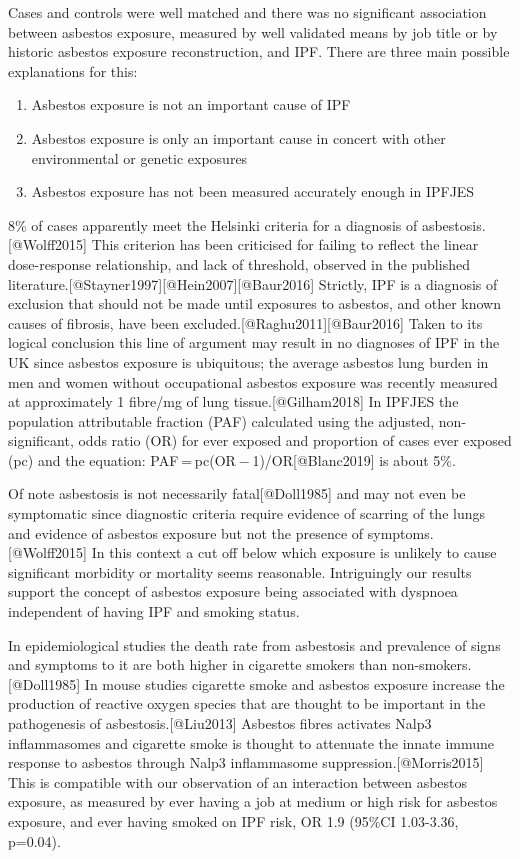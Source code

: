 \documentclass[
]{article}
\providecommand{\tightlist}{%
  \setlength{\itemsep}{0pt}\setlength{\parskip}{0pt}}
\begin{document}
Cases and controls were well matched and there was no significant
association between asbestos exposure, measured by well validated means
by job title or by historic asbestos exposure reconstruction, and IPF.
There are three main possible explanations for this:

\begin{enumerate}
\def\labelenumi{\arabic{enumi}.}
\tightlist
\item
  Asbestos exposure is not an important cause of IPF
\item
  Asbestos exposure is only an important cause in concert with other
  environmental or genetic exposures
\item
  Asbestos exposure has not been measured accurately enough in IPFJES
\end{enumerate}

8\% of cases apparently meet the Helsinki criteria for a diagnosis of
asbestosis.{[}@Wolff2015{]} This criterion has been criticised for
failing to reflect the linear dose-response relationship, and lack of
threshold, observed in the published
literature.{[}@Stayner1997{]}{[}@Hein2007{]}{[}@Baur2016{]} Strictly,
IPF is a diagnosis of exclusion that should not be made until exposures
to asbestos, and other known causes of fibrosis, have been
excluded.{[}@Raghu2011{]}{[}@Baur2016{]} Taken to its logical conclusion
this line of argument may result in no diagnoses of IPF in the UK since
asbestos exposure is ubiquitous; the average asbestos lung burden in men
and women without occupational asbestos exposure was recently measured
at approximately 1 fibre/mg of lung tissue.{[}@Gilham2018{]} In IPFJES
the population attributable fraction (PAF) calculated using the
adjusted, non-significant, odds ratio (OR) for ever exposed and
proportion of cases ever exposed (pc) and the equation:
PAF = pc(OR − 1)/OR{[}@Blanc2019{]} is about 5\%.

Of note asbestosis is not necessarily fatal{[}@Doll1985{]} and may not
even be symptomatic since diagnostic criteria require evidence of
scarring of the lungs and evidence of asbestos exposure but not the
presence of symptoms.{[}@Wolff2015{]} In this context a cut off below
which exposure is unlikely to cause significant morbidity or mortality
seems reasonable. Intriguingly our results support the concept of
asbestos exposure being associated with dyspnoea independent of having
IPF and smoking status.

In epidemiological studies the death rate from asbestosis and prevalence
of signs and symptoms to it are both higher in cigarette smokers than
non-smokers.{[}@Doll1985{]} In mouse studies cigarette smoke and
asbestos exposure increase the production of reactive oxygen species
that are thought to be important in the pathogenesis of
asbestosis.{[}@Liu2013{]} Asbestos fibres activates Nalp3 inflammasomes
and cigarette smoke is thought to attenuate the innate immune response
to asbestos through Nalp3 inflammasome suppression.{[}@Morris2015{]}
This is compatible with our observation of an interaction between
asbestos exposure, as measured by ever having a job at medium or high
risk for asbestos exposure, and ever having smoked on IPF risk, OR 1.9
(95\%CI 1.03-3.36, p=0.04).
\end{document}

